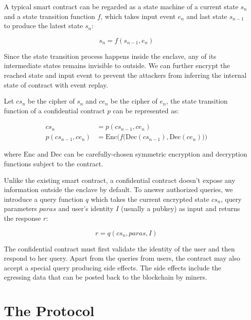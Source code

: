 A typical smart contract can be regarded as a state machine of a current state $s_n$ and a state transition function $f$, which takes input event $e_n$ and last state $s_{n-1}$ to produce the latest state $s_n$:

$$
    s_n = f(s_{n-1}, e_n)
$$

Since the state transition process happens inside the enclave, any of its intermediate states remains invisible to outside.
We can further encrypt the reached state and input event to prevent the attackers from inferring the internal state of contract with event replay.

Let $cs_n$ be the cipher of $s_n$ and $ce_n$ be the cipher of $e_n$, the state transition function of a confidential contract $p$ can be represented as:

\begin{align}
    cs_n              & = p(cs_{n-1}, ce_n)                                                             \\
    p(cs_{n-1}, ce_n) & = \mathrm{Enc}\bigg(f\big(\mathrm{Dec}(cs_{n-1}), \mathrm{Dec}(ce_n)\big)\bigg)
\end{align}

where $\mathrm{Enc}$ and $\mathrm{Dec}$ can be carefully-chosen symmetric encryption and decryption functions subject to the contract.

Unlike the existing smart contract, a confidential contract doesn't expose any information outside the enclave by default. To answer authorized queries, we introduce a query function $q$ which takes the current encrypted state $cs_n$, query parameters $paras$ and user's identity $I$ (usually a pubkey) as input and returns the response $r$:

$$
    r = q(cs_n, paras, I)
$$

The confidential contract must first validate the identity of the user and then respond to her query. Apart from the queries from users, the contract may also accept a special query producing side effects. The side effects include the egressing data that can be posted back to the blockchain by miners.

\section{The Protocol}

